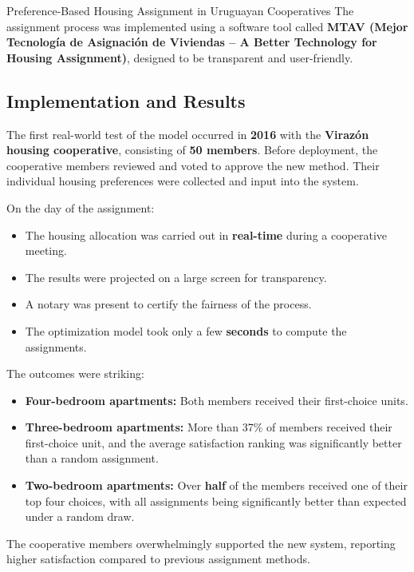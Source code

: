 \begin{casestudybox}{Preference-Based Housing Assignment in Uruguayan Cooperatives}
The assignment process was implemented using a software tool called \textbf{MTAV (Mejor Tecnología de Asignación de Viviendas – A Better Technology for Housing Assignment)}, designed to be transparent and user-friendly.

\subsection*{Implementation and Results}
The first real-world test of the model occurred in \textbf{2016} with the \textbf{Virazón housing cooperative}, consisting of \textbf{50 members}. Before deployment, the cooperative members reviewed and voted to approve the new method. Their individual housing preferences were collected and input into the system.

On the day of the assignment:
\begin{itemize}
    \item The housing allocation was carried out in \textbf{real-time} during a cooperative meeting.
    \item The results were projected on a large screen for transparency.
    \item A notary was present to certify the fairness of the process.
    \item The optimization model took only a few \textbf{seconds} to compute the assignments.
\end{itemize}

The outcomes were striking:
\begin{itemize}
    \item \textbf{Four-bedroom apartments:} Both members received their first-choice units.
    \item \textbf{Three-bedroom apartments:} More than 37\% of members received their first-choice unit, and the average satisfaction ranking was significantly better than a random assignment.
    \item \textbf{Two-bedroom apartments:} Over \textbf{half} of the members received one of their top four choices, with all assignments being significantly better than expected under a random draw.
\end{itemize}

The cooperative members overwhelmingly supported the new system, reporting higher satisfaction compared to previous assignment methods.


\end{casestudybox}

